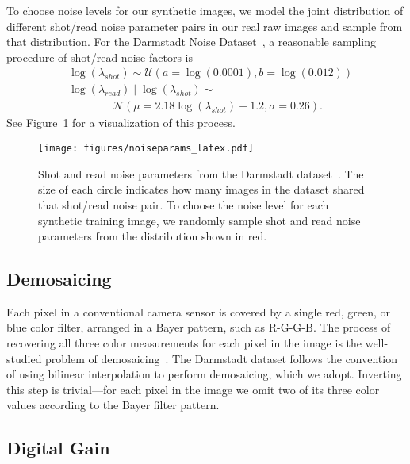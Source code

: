 \documentclass[10pt,twocolumn,letterpaper]{article}
\newcommand{\noise}{\lambda}
\newcommand{\logshotnoise}{\log\left(\noise_{\mathit{shot}}\right)}
\newcommand{\logreadnoise}{\log\left(\noise_{\mathit{read}}\right)}
\begin{document}
To choose noise levels for our synthetic images, we model the joint distribution of different shot/read noise parameter pairs in our real raw images and sample from that distribution.
For the Darmstadt Noise Dataset~\cite{plotz2017cvpr}, a reasonable sampling procedure of shot/read noise factors is
\begin{align}
&\logshotnoise \sim {\mathcal {U}}(a=\log(0.0001),b=\log(0.012)) \nonumber \\
&\logreadnoise \mid \logshotnoise \sim \nonumber \\
& \quad\quad\quad\quad {\displaystyle {\mathcal {N}}(\mu=2.18 \logshotnoise+ 1.2 ,\sigma=0.26)} .
\end{align}
See Figure~\ref{fig:noiseparams} for a visualization of this process.

\begin{figure}[t]
\begin{center}
   \texttt{[image: figures/noiseparams\_latex.pdf]}
\end{center}
   \caption{Shot and read noise parameters from the Darmstadt dataset~\cite{plotz2017cvpr}. The size of each circle indicates how many images in the dataset shared that shot/read noise pair. To choose the noise level for each synthetic training image, we randomly sample shot and read noise parameters from the distribution shown in red.}
\label{fig:noiseparams}
\end{figure}

\subsection{Demosaicing}
\label{sec:demosaic}

Each pixel in a conventional camera sensor is covered by a single red, green, or blue color filter, arranged in a Bayer pattern, such as R-G-G-B. The process of recovering all three color measurements for each pixel in the image is the well-studied problem of demosaicing~\cite{GharbiDemosaic}. The Darmstadt dataset follows the convention of using bilinear interpolation to perform demosaicing, which we adopt. Inverting this step is trivial---for each pixel in the image we omit two of its three color values according to the Bayer filter pattern.

\subsection{Digital Gain}
\label{sec:gain}
\end{document}
